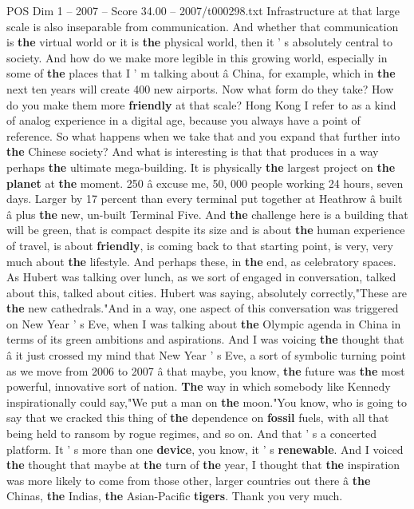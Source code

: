 \begin{textsample}{POS Dim 1 – 2007 – Score 34.00 – 2007/t000298.txt}
Infrastructure at that large scale is also inseparable from communication.
And whether that communication is \textbf{the} virtual world or it is \textbf{the} physical world, then it ' s absolutely central to society.
And how do we make more legible in this growing world, especially in some of \textbf{the} places that I ' m talking about â China, for example, which in \textbf{the} next ten years will create 400 new airports.
Now what form do they take?
How do you make them more \textbf{friendly} at that scale?
Hong Kong I refer to as a kind of analog experience in a digital age, because you always have a point of reference.
So what happens when we take that and you expand that further into \textbf{the} Chinese society?
And what is interesting is that that produces in a way perhaps \textbf{the} ultimate mega-building.
It is physically \textbf{the} largest project on \textbf{the} \textbf{planet} at \textbf{the} moment. 250 â excuse me, 50, 000 people working 24 hours, seven days.
Larger by 17 percent than every terminal put together at Heathrow â built â plus \textbf{the} new, un-built Terminal Five.
And \textbf{the} challenge here is a building that will be green, that is compact despite its size and is about \textbf{the} human experience of travel, is about \textbf{friendly}, is coming back to that starting point, is very, very much about \textbf{the} lifestyle.
And perhaps these, in \textbf{the} end, as celebratory spaces.
As Hubert was talking over lunch, as we sort of engaged in conversation, talked about this, talked about cities.
Hubert was saying, absolutely correctly,"These are \textbf{the} new cathedrals."And in a way, one aspect of this conversation was triggered on New Year ' s Eve, when I was talking about \textbf{the} Olympic agenda in China in terms of its green ambitions and aspirations.
And I was voicing \textbf{the} thought that â it just crossed my mind that New Year ' s Eve, a sort of symbolic turning point as we move from 2006 to 2007 â that maybe, you know, \textbf{the} future was \textbf{the} most powerful, innovative sort of nation. \textbf{The} way in which somebody like Kennedy inspirationally could say,"We put a man on \textbf{the} moon."You know, who is going to say that we cracked this thing of \textbf{the} dependence on \textbf{fossil} fuels, with all that being held to ransom by rogue regimes, and so on.
And that ' s a concerted platform.
It ' s more than one \textbf{device}, you know, it ' s \textbf{renewable}.
And I voiced \textbf{the} thought that maybe at \textbf{the} turn of \textbf{the} year, I thought that \textbf{the} inspiration was more likely to come from those other, larger countries out there â \textbf{the} Chinas, \textbf{the} Indias, \textbf{the} Asian-Pacific \textbf{tigers}.
Thank you very much.

\end{textsample}

